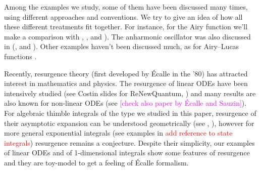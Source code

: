 \documentclass{article}
\theoremstyle{definition}
\begin{document}
Among the examples we study, some of them have been discussed many times, using different approaches and conventions. We try to give an idea of how all these different treatments fit together. For instance, for the Airy function we’ll make a comparison with \cite[Section 2.2]{lectures-Marino}, \cite[Section 6.14]{diverg-resurg-i}, and \cite[Section 2.2]{kawai-takei}). The anharmonic oscillator was also discussed in (\cite{bender-wu}, \cite[Appendix B]{aniceto2019primer} and \cite[Section 2.5.3]{sternin1995borel}). Other examples haven't been discussed much, as for Airy--Lucas functions \cite[Equation 3.2]{charbonnier22}. 

 
Recently, resurgence theory (first developed by \'Ecalle in the '80) has attracted interest in mathematics and physics. The resurgence of linear ODEs have been intensively studied (see Costin slides for ReNewQuantum, \cite{EcalleIII,loday1994stokes,diverg-resurg--ii}) and many results are also known for non-linear ODEs (see \cite{schiappa-PI,costin-PI,diverg-resurg-iii} \textcolor{magenta}{[check also paper by \'Ecalle and Sauzin]}). For algebraic thimble integrals of the type we studied in this paper, resurgence of their asymptotic expansion can be understood geometrically (see \cite{Maxim_slide_ERC}, \cite[Section 6.2]{kontsevich2022analyticity}), however for more general exponential integrals (see examples in \cite{Maxim_slide_ERC} \textcolor{red}{add reference to state integrals}) resurgence remains a conjecture. Despite their simplicity, our examples of linear ODEs and of 1-dimensional integrals show some features of resurgence and they are toy-model to get a feeling of \'Ecalle formalism. 
\end{document}
